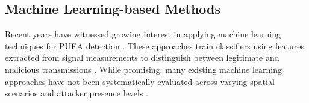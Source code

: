 \subsection{Machine Learning-based Methods}
Recent years have witnessed growing interest in applying machine learning techniques for PUEA detection  \cite{ref9, ref23}. These approaches train classifiers using features extracted from signal measurements to distinguish between legitimate and malicious transmissions \cite{ref22,ref19}. While promising, many existing machine learning approaches have not been systematically evaluated across varying spatial scenarios and attacker presence levels \cite{ref13}.
